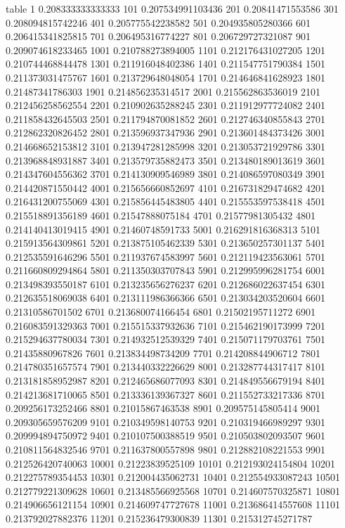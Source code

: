 table {%
1 0.208333333333333
101 0.207534991103436
201 0.20841471553586
301 0.208094815742246
401 0.205775542238582
501 0.204935805280366
601 0.206415341825815
701 0.206495316774227
801 0.206729727321087
901 0.209074618233465
1001 0.210788273894005
1101 0.212176431027205
1201 0.210744468844478
1301 0.211916048402386
1401 0.211547751790384
1501 0.211373031475767
1601 0.213729648048054
1701 0.214646841628923
1801 0.21487341786303
1901 0.214856235314517
2001 0.215562863536019
2101 0.212456258562554
2201 0.210902635288245
2301 0.211912977724082
2401 0.211858432645503
2501 0.211794870081852
2601 0.212746340855843
2701 0.212862320826452
2801 0.213596937347936
2901 0.213601484373426
3001 0.214668652153812
3101 0.213947281285998
3201 0.213053721929786
3301 0.213968848931887
3401 0.213579735882473
3501 0.213480189013619
3601 0.214347604556362
3701 0.214130909546989
3801 0.214086597080349
3901 0.214420871550442
4001 0.215656660852697
4101 0.216731829474682
4201 0.216431200755069
4301 0.215856445483805
4401 0.215553597538418
4501 0.215518891356189
4601 0.21547888075184
4701 0.21577981305432
4801 0.214140413019415
4901 0.21460748591733
5001 0.216291816368313
5101 0.215913564309861
5201 0.213875105462339
5301 0.213650257301137
5401 0.212535591646296
5501 0.211937674583997
5601 0.212119423563061
5701 0.211660809294864
5801 0.211350303707843
5901 0.212995996281754
6001 0.213498393550187
6101 0.213235656276237
6201 0.212686022637454
6301 0.212635518069038
6401 0.213111986366366
6501 0.213034203520604
6601 0.21310586701502
6701 0.213680074166454
6801 0.21502195711272
6901 0.216083591329363
7001 0.215515337932636
7101 0.215462190173999
7201 0.215294637780034
7301 0.214932512539329
7401 0.215071179703761
7501 0.21435880967826
7601 0.213834498734209
7701 0.214208844906712
7801 0.214780351657574
7901 0.213440332226629
8001 0.213287744317417
8101 0.213181858952987
8201 0.212465686077093
8301 0.214849556679194
8401 0.214213681710065
8501 0.213336139367327
8601 0.211552733217336
8701 0.209256173252466
8801 0.21015867463538
8901 0.209575145805414
9001 0.209305659576209
9101 0.210349598140753
9201 0.210319466989297
9301 0.209994894750972
9401 0.210107500388519
9501 0.210503802093507
9601 0.210811564832546
9701 0.211637800557898
9801 0.212882108221553
9901 0.212526420740063
10001 0.21223839525109
10101 0.212193024154804
10201 0.212275789354453
10301 0.212004435062731
10401 0.212554933087243
10501 0.212779221309628
10601 0.213485566925568
10701 0.214607570325871
10801 0.214906656121154
10901 0.214609747727678
11001 0.213686414557608
11101 0.213792027882376
11201 0.215236479300839
11301 0.215312745271787
}
